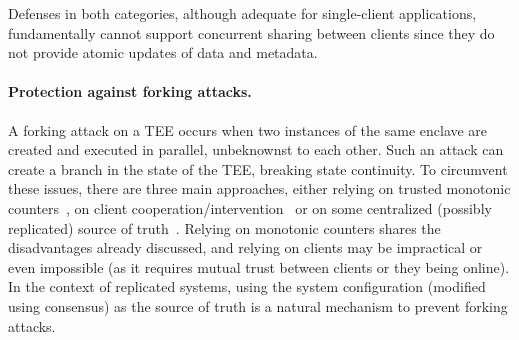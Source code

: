 Defenses in both categories, although adequate for single-client
applications, fundamentally cannot support concurrent sharing
between clients since they do not provide atomic updates of data
and metadata.

\paragraph{Protection against forking attacks.}
A forking attack on a TEE occurs when two instances of the same
enclave are created and executed in parallel, unbeknownst to each
other. Such an attack can create a branch in the state of the
TEE, breaking state continuity. To circumvent these issues, there
are three main approaches, either relying on trusted monotonic
counters~\cite{rote,ariadne,a2m,trinc,memoir},  on client
cooperation/intervention~\cite{fork_verify,fork_fail,fork_comm,fork_lcm,fork_sporc,fork_fs,fork_venus}
or  on some centralized (possibly replicated) source of
truth~\cite{haven}. Relying on monotonic counters shares the
disadvantages already discussed, and relying on clients may be
impractical or even impossible (as it requires mutual trust
between clients or they being online). In the context of
replicated systems, using the system configuration (modified
using consensus) as the source of truth is a natural mechanism to
prevent forking attacks.

